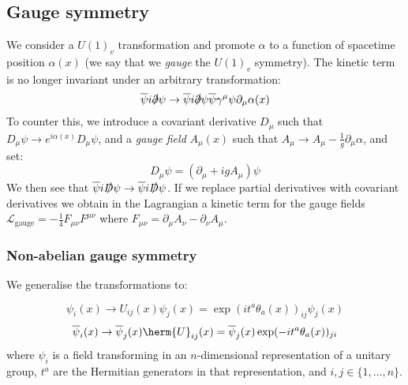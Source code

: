 \documentclass{jknotes}
\begin{document}
\subsection{Gauge symmetry}
We consider a \(U(1)_v\) transformation and promote \(\alpha\) to a function of spacetime position \(\alpha(x)\) (we say that we \emph{gauge} the \(U(1)_v\) symmetry). The kinetic term is no longer invariant under an arbitrary transformation:
\begin{equation}
    \overline{\psi}i\slashed{\partial}\psi \rightarrow \overline{\psi}i\slashed{\partial}\psi \overline{\psi}\gamma^\mu\psi\partial_\mu\alpha(x)
\end{equation}
To counter this, we introduce a covariant derivative \(D_\mu\) such that \(D_\mu\psi\rightarrow e^{i\alpha(x)}D_\mu\psi\), and a \emph{gauge field} \(A_\mu(x)\) such that \(A_\mu \rightarrow A_\mu - \frac{1}{g}\partial_\mu\alpha\), and set:
\begin{equation}
    D_\mu\psi = (\partial_\mu + igA_\mu)\psi
\end{equation}
We then see that \(\overline{\psi}i\slashed{D}\psi \rightarrow \overline{\psi}i\slashed{D}\psi\). If we replace partial derivatives with covariant derivatives we obtain in the Lagrangian a kinetic term for the gauge fields \(\mathcal{L}_{\text{gauge}} = - \frac{1}{4}F_{\mu\nu}F^{\mu\nu}\) where \(F_{\mu\nu} = \partial_\mu A_\nu - \partial_\nu A_\mu\).

\subsubsection{Non-abelian gauge symmetry}

We generalise the transformations to:

\begin{equation}
    \psi_i(x) \rightarrow U_{ij}(x)\psi_j(x) = \exp(it^a\theta_a(x))_{ij}\psi_j(x)
\end{equation}
\begin{equation}
    \overline{\psi}_i(x) \rightarrow \overline{\psi}_j(x) \herm{U}_{ij}(x) = \overline{\psi}_j(x)\exp(-it^a\theta_a(x))_{ji}
\end{equation}
where \(\psi_i\) is a field transforming in an \(n\)-dimensional representation of a unitary group, \(t^a\) are the Hermitian generators in that representation, and \(i,j\in\{1,\dots,n\}\).
\end{document}
